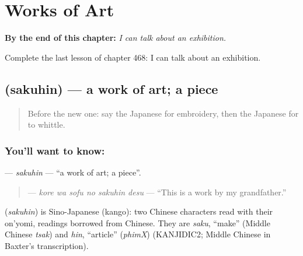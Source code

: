 
\chapter{Works of Art}
\label{ch:ja-works-of-art}

\begin{chapteropening}
\textbf{By the end of this chapter:} \emph{I can talk about an exhibition.}

Complete the last lesson of chapter 468: I can talk about an exhibition.
\end{chapteropening}

\section[\texorpdfstring{\ja{さくひん} (sakuhin)}{さくひん (sakuhin)}]{ (sakuhin) — a work of art; a piece}

\label{lesson:JA-C468-sakuhin}



\begin{quote}
Before the new one: say the Japanese for embroidery, then the Japanese for to whittle.
\end{quote}

\subsection*{You'll want to know: }
\textbf{} — \emph{sakuhin} — \textquotedblleft{}a work of art; a piece\textquotedblright{}.

\begin{quote}
\textbf{  } — \emph{kore wa sofu no sakuhin desu} — \textquotedblleft{}This is a work by my grandfather.\textquotedblright{}
\end{quote}

\begin{cousinweb}
\textbf{} (\emph{sakuhin}) is Sino-Japanese (kango): two Chinese characters read with their on'yomi, readings borrowed from Chinese. They are \emph{saku}, \textquotedblleft{}make\textquotedblright{} (Middle Chinese \emph{tsak}) and \emph{hin}, \textquotedblleft{}article\textquotedblright{} (\emph{phimX}) (KANJIDIC2; Middle Chinese in Baxter's transcription).
\end{cousinweb}

